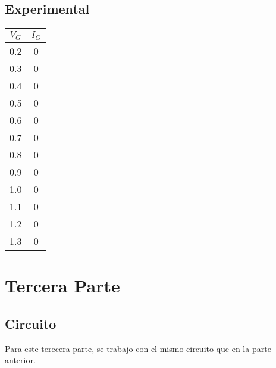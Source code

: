   \subsection{Experimental}
\begin{minipage}{0.3\linewidth}
\centering
  \begin{table}[H]
    \begin{center}
      \begin{tabular}{c|c}
        $V_{G}$ &$I_{G}$   \\
        \hline
        0.2 &0   \\
        0.3 &0   \\
        0.4 &0   \\
        0.5 &0   \\
        0.6 &0   \\
        0.7 &0   \\
        0.8 &0   \\
        0.9 &0   \\
        1.0 &0   \\
        1.1 &0   \\
        1.2 &0   \\
        1.3 &0   \\
      \end{tabular}
    \end{center} 
  \end{table}
\end{minipage}
\begin{minipage}{0.7\linewidth}
\centering
{}
\end{minipage}
\section{Tercera Parte}
\subsection{Circuito}
Para este terecera parte, se trabajo con el mismo circuito que en la parte anterior.
